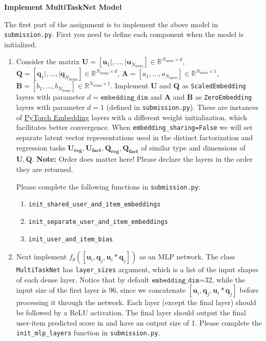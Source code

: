 \item {\bf Implement MultiTaskNet Model}

The first part of the assignment is to implement the above model in \texttt{submission.py}. First you need to define each component when the model is initialized. 

\begin{enumerate}
    \item {} Consider the matrix $\mathbf{U} = [\mathbf{u}_1\mid,\ldots,\mid \mathbf{u}_{N_{\text{users}}}]\in\mathbb{R}^{N_{\text{users}}\times d}$, $\mathbf{Q} = [\mathbf{q}_1\mid,\ldots,\mid\mathbf{q}_{N_{\text{items}}}]\in\mathbb{R}^{N_{\text{items}}\times d}$, $\mathbf{A} = [a_1, \ldots, a_{N_{\text{users}}}]\in \mathbb{R}^{N_{\text{users}}\times 1}$, $\mathbf{B} = [b_1, \ldots, b_{N_{\text{items}}}]\in \mathbb{R}^{N_{\text{items}}\times 1}$. Implement $\mathbf{U}$ and $\mathbf{Q}$ as \texttt{ScaledEmbedding} layers  with parameter $d=\texttt{embedding\_dim}$ and $\mathbf{A}$ and $\mathbf{B}$ as \texttt{ZeroEmbedding} layers with parameter $d=1$ (defined in \texttt{submission.py}). These are instances of \href{https://pytorch.org/docs/stable/generated/torch.nn.Embedding.html}{PyTorch Embedding} layers with a different weight initialization, which facilitates better convergence.
    When \texttt{embedding\_sharing=False} we will set separate latent vector representations used in the distinct factorization and regression tasks $\mathbf{U_{reg}}, \mathbf{U_{fact}}, \mathbf{Q_{reg}}, \mathbf{Q_{fact}}$ of similar type and dimensions of $\mathbf{U}, \mathbf{Q}$. \textbf{Note: }Order does matter here! Please declare the layers in the order
    they are returned.
    
    Please complete the following functions in \texttt{submission.py}:
    \begin{enumerate}
        \item \texttt{init\_shared\_user\_and\_item\_embeddings}
        \item \texttt{init\_separate\_user\_and\_item\_embeddings}
        \item \texttt{init\_user\_and\_item\_bias}
    \end{enumerate}

    \item {} Next implement $f_{\theta}([\mathbf{u}_i, \mathbf{q}_j, \mathbf{u}_i * \mathbf{q}_j])$ as an MLP network. The class \texttt{MultiTaskNet} has \texttt{layer\_sizes} argument, which is a list of the input shapes of each dense layer. Notice that by default $\texttt{embedding\_dim}$=32, while the input size of the first layer is 96, since we concatenate $[\mathbf{u}_i, \mathbf{q}_j, \mathbf{u}_i * \mathbf{q}_j]$ before processing it through the network. Each layer (except the final layer) should be followed by a ReLU activation. The final layer should output the final user-item predicted score in and have an output size of 1. Please complete the \texttt{init\_mlp\_layers} function in \texttt{submission.py}.
\end{enumerate}
